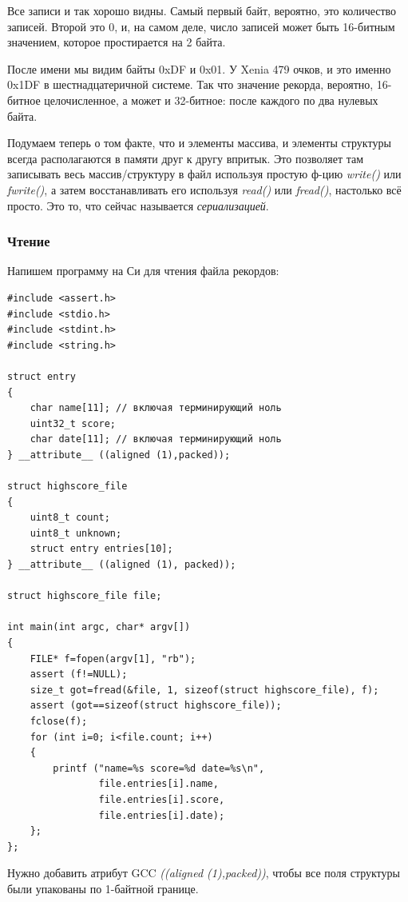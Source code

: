 Все записи и так хорошо видны.
Самый первый байт, вероятно, это количество записей.
Второй это 0, и, на самом деле, число записей может быть 16-битным значением, которое простирается на 2 байта.

После имени  мы видим байты 0xDF и 0x01.
У Xenia 479 очков, и это именно 0x1DF в шестнадцатеричной системе.
Так что значение рекорда, вероятно, 16-битное целочисленное, а может и 32-битное: после каждого по два нулевых байта.

Подумаем теперь о том факте, что и элементы массива, и элементы структуры всегда располагаются в памяти друг к другу впритык.
Это позволяет там записывать весь массив/структуру в файл используя простую ф-цию \emph{write()} или \emph{fwrite()}, 
а затем восстанавливать его используя \emph{read()} или \emph{fread()}, настолько всё просто.
Это то, что сейчас называется \emph{сериализацией}.

\subsubsection{Чтение}

Напишем программу на Си для чтения файла рекордов:

\begin{lstlisting}[style=customc]
#include <assert.h>
#include <stdio.h>
#include <stdint.h>
#include <string.h>

struct entry
{
	char name[11]; // включая терминирующий ноль
	uint32_t score;
	char date[11]; // включая терминирующий ноль
} __attribute__ ((aligned (1),packed));

struct highscore_file
{
	uint8_t count;
	uint8_t unknown;
	struct entry entries[10];
} __attribute__ ((aligned (1), packed));

struct highscore_file file;

int main(int argc, char* argv[])
{
	FILE* f=fopen(argv[1], "rb");
	assert (f!=NULL);
	size_t got=fread(&file, 1, sizeof(struct highscore_file), f);
	assert (got==sizeof(struct highscore_file));
	fclose(f);
	for (int i=0; i<file.count; i++)
	{
		printf ("name=%s score=%d date=%s\n",
				file.entries[i].name,
				file.entries[i].score,
				file.entries[i].date);
	};
};
\end{lstlisting}

Нужно добавить атрибут GCC \emph{((aligned (1),packed))}, чтобы все поля структуры были упакованы по 1-байтной границе.

